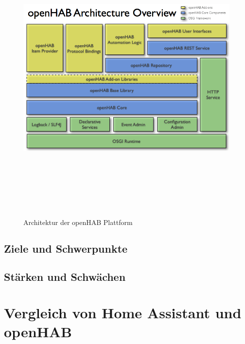     \begin{figure}[hbt!]
        \centering
        \includegraphics[width=15cm,height=15cm,keepaspectratio]{images/openhab-architecture.png}
        \caption{Architektur der openHAB Plattform \cite{openHAB-architecture2018}}
        \label{fig:architectureopenHAB}
    \end{figure}




\subsection{Ziele und Schwerpunkte}
\subsection{Stärken und Schwächen}

\section{Vergleich von Home Assistant und openHAB}
\label{sec:comparison-HAOS-openHAB}

